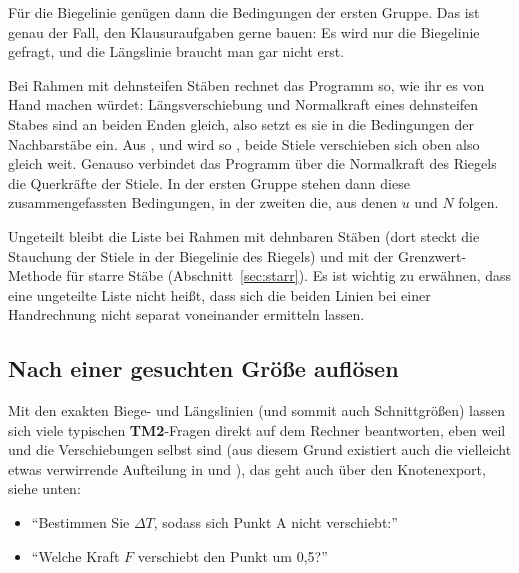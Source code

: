 \begin{center}
\end{center}

Für die Biegelinie genügen dann die Bedingungen der ersten Gruppe. Das ist genau der Fall, den
Klausuraufgaben gerne bauen: Es wird nur die Biegelinie gefragt, und die Längslinie braucht man
gar nicht erst.

Bei Rahmen mit dehnsteifen Stäben rechnet das Programm so, wie ihr es von Hand machen würdet:
Längsverschiebung und Normalkraft eines dehnsteifen Stabes sind an beiden Enden gleich, also setzt
es sie in die Bedingungen der Nachbarstäbe ein. Aus ,
 und  wird so
, beide Stiele verschieben sich oben also gleich weit.
Genauso verbindet das Programm über die Normalkraft des Riegels die Querkräfte der Stiele. In der
ersten Gruppe stehen dann diese zusammengefassten Bedingungen, in der zweiten die, aus denen $u$
und $N$ folgen.

Ungeteilt bleibt die Liste bei Rahmen mit dehnbaren Stäben (dort steckt die Stauchung der Stiele
in der Biegelinie des Riegels) und mit der Grenzwert-Methode für starre Stäbe
(Abschnitt~\ref{sec:starr}). Es ist wichtig zu erwähnen, dass eine ungeteilte Liste nicht heißt,
dass sich die beiden Linien bei einer Handrechnung nicht separat voneinander ermitteln lassen.

\subsection{Nach einer gesuchten Größe auflösen}

Mit den exakten Biege- und Längslinien (und sommit auch Schnittgrößen) lassen sich viele
typischen \textbf{TM2}-Fragen direkt auf dem Rechner beantworten, eben weil  und  die Verschiebungen selbst sind
(aus diesem Grund existiert auch die vielleicht etwas verwirrende Aufteilung in  und ), das geht auch über den Knotenexport, siehe unten:


\begin{itemize}
  \item \enquote{Bestimmen Sie $\Delta T$, sodass sich Punkt A nicht verschiebt:}\\
  \item \enquote{Welche Kraft $F$ verschiebt den Punkt um 0,5?}\\
\end{itemize}

